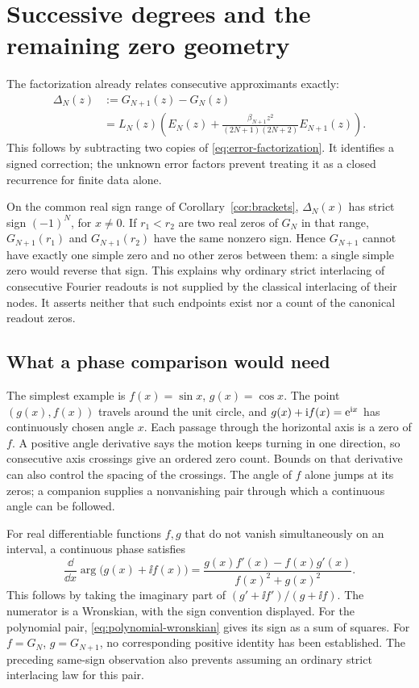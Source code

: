 \section{Successive degrees and the remaining zero geometry}
\label{sec:zero-geometry}

The factorization already relates consecutive approximants exactly:
\begin{equation}
 \begin{aligned}
 \Delta_N(z)&:=G_{N+1}(z)-G_N(z)\\
 &=L_N(z)\left(E_N(z)+
       \frac{\beta_{N+1}z^2}{(2N+1)(2N+2)}E_{N+1}(z)\right).
 \end{aligned}
 \label{eq:degree-step}
\end{equation}
This follows by subtracting two copies of
\eqref{eq:error-factorization}. It identifies a signed correction;
the unknown error factors prevent treating it as a closed recurrence
for finite data alone.

On the common real sign range of Corollary~\ref{cor:brackets},
\(\Delta_N(x)\) has strict sign \((-1)^N\), for \(x\ne0\).
If \(r_1<r_2\) are two real zeros of \(G_N\) in that range,
\(G_{N+1}(r_1)\) and \(G_{N+1}(r_2)\) have the same nonzero sign.
Hence \(G_{N+1}\) cannot have exactly one simple zero and no other
zeros between them: a single simple zero would reverse that sign.
This explains why ordinary strict interlacing of consecutive Fourier
readouts is not supplied by the classical interlacing of their nodes.
It asserts neither that such endpoints exist nor a count of the
canonical readout zeros.

\subsection{What a phase comparison would need}

The simplest example is \(f(x)=\sin x\), \(g(x)=\cos x\).
The point \((g(x),f(x))\) travels around the unit circle, and
\(g(x)+\mathrm i f(x)=\mathrm e^{\mathrm i x}\) has continuously chosen angle \(x\).
Each passage through the horizontal axis is a zero of \(f\).
A positive angle derivative says the motion keeps turning in one
direction, so consecutive axis crossings give an ordered zero count.
Bounds on that derivative can also control the spacing of the crossings.
The angle of \(f\) alone jumps at its zeros; a companion supplies a
nonvanishing pair through which a continuous angle can be followed.

For real differentiable functions \(f,g\) that do not vanish
simultaneously on an interval, a continuous phase satisfies
\begin{equation}
 \frac{\dd}{\dd x}\arg\bigl(g(x)+\ii f(x)\bigr)
       =\frac{g(x)f'(x)-f(x)g'(x)}{f(x)^2+g(x)^2}.
 \label{eq:companion-phase}
\end{equation}
This follows by taking the imaginary part of
\((g'+\ii f')/(g+\ii f)\).
The numerator is a Wronskian, with the sign convention displayed.
For the polynomial pair, \eqref{eq:polynomial-wronskian} gives
its sign as a sum of squares. For \(f=G_N\), \(g=G_{N+1}\),
no corresponding positive identity has been established.
The preceding same-sign observation also prevents assuming an
ordinary strict interlacing law for this pair.

